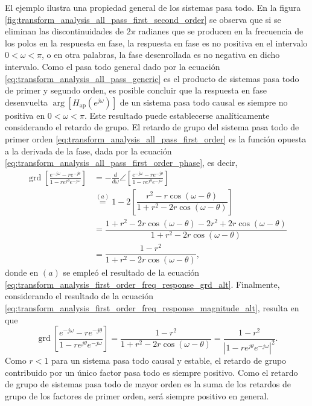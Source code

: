 \documentclass[a4paper]{report}
\DeclareMathOperator{\grd}{grd}
\begin{document}
El ejemplo ilustra una propiedad general de los sistemas pasa todo. En la figura \ref{fig:transform_analysis_all_pass_first_second_order} se observa que si se eliminan las discontinuidades de \(2\pi\) radianes que se producen en la frecuencia de los polos en la respuesta en fase, la respuesta en fase es no positiva en el intervalo \(0<\omega<\pi\), o en otra palabras, la fase desenrollada es no negativa en dicho intervalo. Como el pasa todo general dado por la ecuación \ref{eq:transform_analysis_all_pass_generic} es el producto de sistemas pasa todo de primer y segundo orden, es posible concluir que la respuesta en fase desenvuelta \(\arg[H_\textrm{ap}(e^{j\omega})]\) de un sistema pasa todo causal es siempre no positiva en \(0<\omega<\pi\). Este resultado puede establecerse analíticamente considerando el retardo de grupo. El retardo de grupo del sistema pasa todo de primer orden \ref{eq:transform_analysis_all_pass_first_order} es la función opuesta a la derivada de la fase, dada por la ecuación \ref{eq:transform_analysis_all_pass_first_order_phase}, es decir,
\begin{align*}
 \grd\left[\frac{e^{-j\omega}-re^{-j\theta}}{1-re^{j\theta}e^{-j\omega}}\right]
   &=-\frac{d}{d\omega}\angle\left[\frac{e^{-j\omega}-re^{-j\theta}}{1-re^{j\theta}e^{-j\omega}}\right]\\
   &\overset{(a)}{=}1-2\left[\dfrac{r^2-r\cos(\omega-\theta)}{1+r^2-2r\cos(\omega-\theta)}\right]\\ 
   &=\dfrac{1+r^2-2r\cos(\omega-\theta)-2r^2+2r\cos(\omega-\theta)}{1+r^2-2r\cos(\omega-\theta)}\\
   &=\dfrac{1-r^2}{1+r^2-2r\cos(\omega-\theta)},
\end{align*}
donde en \((a)\) se empleó el resultado de la ecuación \ref{eq:transform_analysis_first_order_freq_response_grd_alt}. Finalmente, considerando el resultado de la ecuación \ref{eq:transform_analysis_first_order_freq_response_magnitude_alt}, resulta en que 
\begin{equation}\label{eq:transform_analysis_all_pass_first_order_grd}
 \grd\left[\frac{e^{-j\omega}-re^{-j\theta}}{1-re^{j\theta}e^{-j\omega}}\right]=\dfrac{1-r^2}{1+r^2-2r\cos(\omega-\theta)}=\frac{1-r^2}{|1-re^{j\theta}e^{-j\omega}|^2}.
\end{equation}
Como \(r<1\) para un sistema pasa todo causal y estable, el retardo de grupo contribuido por un único factor pasa todo es siempre positivo. Como el retardo de grupo de sistemas pasa todo de mayor orden es la suma de los retardos de grupo de los factores de primer orden, será siempre positivo en general.  
\end{document}
